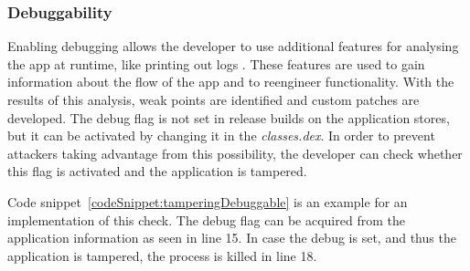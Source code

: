 \subsubsection{Debuggability} \label{subsection:section:counter-improve-tampering-debuggable}
Enabling debugging allows the developer to use additional features for analysing the app at runtime, like printing out logs \cite{androidDebugging}.
These features are used to gain information about the flow of the app and to reengineer functionality.
With the results of this analysis, weak points are identified and custom patches are developed.
\newline
The debug flag is not set in release builds on the application stores, but it can be activated by changing it in the \textit{classes.dex}.
In order to prevent attackers taking advantage from this possibility, the developer can check whether this flag is activated and the application is tampered.
\newline

Code snippet~\ref{codeSnippet:tamperingDebuggable} is an example for an implementation of this check.
The debug flag can be acquired from the application information as seen in line 15.
In case the debug is set, and thus the application is tampered, the process is killed in line 18.
